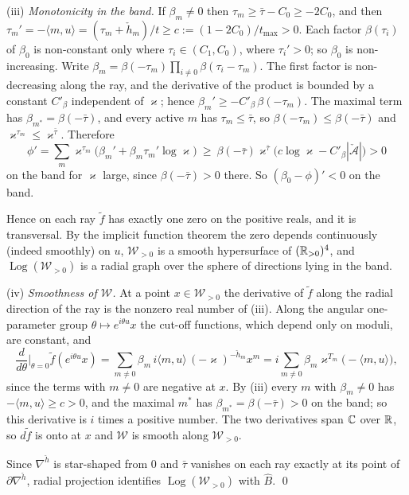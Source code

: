 (iii) \emph{Monotonicity in the band.} If $\beta_m\neq0$ then $\tau_m\ge \bar\tau-C_0\ge-2C_0$, and then $\tau_m'=-\langle m,u\rangle=(\tau_m+\check h_m)/t\ge c:=(1-2C_0)/t_{\max}>0$. Each factor $\beta(\tau_i)$ of $\beta_0$ is non-constant only where $\tau_i\in(C_1,C_0)$, where $\tau_i'>0$; so $\beta_0$ is non-increasing. Write $\beta_m=\beta(-\tau_m)\prod_{i\ne0}\beta(\tau_i-\tau_m)$. The first factor is non-decreasing along the ray, and the derivative of the product is bounded by a constant $C'_\beta$ independent of $\varkappa$; hence $\beta_m'\ge-C'_\beta\,\beta(-\tau_m)$. The maximal term has $\beta_{m^*}=\beta(-\bar\tau)$, and every active $m$ has $\tau_m\le \bar\tau$, so $\beta(-\tau_m)\le \beta(-\bar\tau)$ and $\varkappa^{\tau_m}\le \varkappa^{\bar\tau}$. Therefore
\[
\phi'=\sum_m\varkappa^{\tau_m}\bigl(\beta_m'+\beta_m\tau_m'\log \varkappa\bigr)\ \ge\ \beta(-\bar\tau)\varkappa^{\bar\tau}\bigl(c\log \varkappa-C'_\beta|\check{\mathcal A}|\bigr)>0
\]
on the band for $\varkappa$ large, since $\beta(-\bar\tau)>0$ there. So $(\beta_0-\phi)'<0$ on the band.

Hence on each ray $\tilde f$ has exactly one zero on the positive reals, and it is transversal. By the implicit function theorem the zero depends continuously (indeed smoothly) on $u$, $\mathscr W_{>0}$ is a smooth hypersurface of $(\mathbb R_{>0})^4$, and $\operatorname{Log}(\mathscr W_{>0})$ is a radial graph over the sphere of directions lying in the band.

(iv) \emph{Smoothness of $\mathscr W$.} At a point $x\in \mathscr W_{>0}$ the derivative of $\tilde f$ along the radial direction of the ray is the nonzero real number of (iii). Along the angular one-parameter group $\theta\mapsto e^{i\theta u}x$ the cut-off functions, which depend only on moduli, are constant, and
\[
\frac{d}{d\theta}\Big|_{\theta=0}\tilde f(e^{i\theta u}x)=\sum_{m\neq0}\beta_m\,i\langle m,u\rangle\,(-\varkappa)^{-\check h_m}x^m=i\sum_{m\neq0}\beta_m\varkappa^{T_m}\bigl(-\langle m,u\rangle\bigr),
\]
since the terms with $m\neq0$ are negative at $x$. By (iii) every $m$ with $\beta_m\neq0$ has $-\langle m,u\rangle\ge c>0$, and the maximal $m^*$ has $\beta_{m^*}=\beta(-\bar\tau)>0$ on the band; so this derivative is $i$ times a positive number. The two derivatives span $\mathbb C$ over $\mathbb R$, so $d\tilde f$ is onto at $x$ and $\mathscr W$ is smooth along $\mathscr W_{>0}$.

Since $\nabla^{\check h}$ is star-shaped from $0$ and $\bar\tau$ vanishes on each ray exactly at its point of $\partial\nabla^{\check h}$, radial projection identifies $\operatorname{Log}(\mathscr W_{>0})$ with $\widehat B$. \qed


